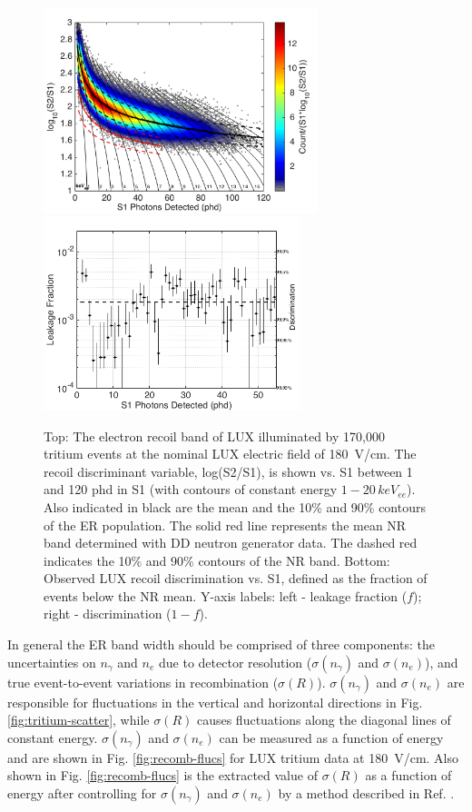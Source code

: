 \begin{figure}[h!]
\includegraphics[width=80mm]{fig/CH3T_ER_Band.png}
\includegraphics[width=75mm]{fig/CH3T_Leakage_Run03.png}
\caption{Top: The electron recoil band of LUX illuminated by 170,000 tritium events at the nominal LUX electric field of 180~V/cm.  The recoil discriminant variable, log(S2/S1), is shown vs. S1 between 1 and 120 phd in S1 (with contours of constant energy $1-20 \, keV_{ee}$). Also indicated in black are the mean and the 10\% and 90\% contours of the ER population. The solid red line represents the mean NR band determined with DD neutron generator data. The dashed red indicates the 10\% and 90\% contours of the NR band. Bottom: Observed LUX recoil discrimination vs. S1, defined as the fraction of events below the NR mean. Y-axis labels: left -  leakage fraction ($f$); right - discrimination ($1-f$).}
\label{fig:ER_band}
\end{figure}

In general the ER band width should be comprised of three components: the uncertainties on  $n_{\gamma}$ and $n_e$  due to detector resolution ($ \sigma(n_{\gamma})$ and $ \sigma(n_e)$), and true event-to-event variations in recombination ($ \sigma(R)$). $ \sigma(n_{\gamma})$ and $ \sigma(n_e)$ are responsible for fluctuations in the vertical  and horizontal directions in Fig. \ref{fig:tritium-scatter},  while $ \sigma(R)$ causes fluctuations along the diagonal lines of constant energy. $ \sigma(n_{\gamma})$ and $ \sigma(n_e)$ can be measured as a function of energy and are shown in Fig. \ref{fig:recomb-flucs} for LUX tritium data at 180~V/cm\cite{Dobi_Thesis}. Also shown in Fig. \ref{fig:recomb-flucs} is the extracted value of $ \sigma(R)$ as a function of energy after controlling for $ \sigma(n_{\gamma})$ and $ \sigma(n_e)$ by a method described in Ref. \cite{Dobi_Thesis}. 

